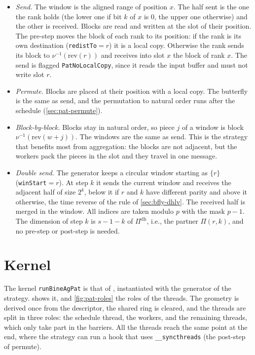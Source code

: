 \begin{itemize}
  \item \emph{Send.} The window is the aligned range of position $x$. The half sent is the one the rank holds (the lower one if bit $k$ of $x$ is $0$, the upper one otherwise) and the other is received. Blocks are read and written at the slot of their position.
  The pre-step moves the block of each rank to its position: if the rank is its own destination (\texttt{redistTo}$=r$) it is a local copy. Otherwise the rank sends its block to $\nu^{-1}(\mathrm{rev}(r))$ and receives into slot $x$ the block of rank $x$. The send is flagged \texttt{PatNoLocalCopy}, since it reads the input buffer and must not write slot $r$.
  \item \emph{Permute.} Blocks are placed at their position with a local copy. The butterfly is the same as send, and the permutation to natural order runs after the schedule (\cref{sec:pat-permute}).
  \item \emph{Block-by-block.} Blocks stay in natural order, so piece $j$ of a window is block $\nu^{-1}(\mathrm{rev}(w+j))$. The windows are the same as send. This is the strategy that benefits most from aggregation: the blocks are not adjacent, but the workers pack the pieces in the slot and they travel in one message.
  \item \emph{Double send.} The generator keeps a circular window starting as $\{r\}$ (\texttt{winStart}$=r$). At step $k$ it sends the current window and receives the adjacent half of size $2^k$, below it if $r$ and $k$ have different parity and above it otherwise, the time reverse of the rule of \cref{sec:bfly-dhlv}. The received half is merged in the window. All indices are taken modulo $p$ with the mask $p-1$. The dimension of step $k$ is $s-1-k$ of $\Pi^{\mathrm{dh}}$, i.e., the partner $\Pi(r,k)$, and no pre-step or post-step is needed.
\end{itemize}

\section{Kernel}\label{sec:pat-kernel}

The kernel \texttt{runBineAgPat} is that of \pat{}, instantiated with the generator of the strategy.
 shows it, and \cref{fig:pat-roles} the roles of the threads.
The geometry is derived once from the descriptor, the shared ring is cleared, and the threads are split in three roles: the schedule thread, the workers, and the remaining threads, which only take part in the barriers.
All the threads reach the same point at the end, where the strategy can run a hook that uses \texttt{\_\_syncthreads} (the post-step of permute).

